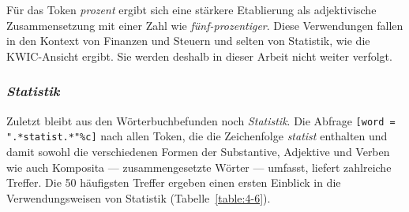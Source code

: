 \space

Für das Token \textit{prozent} ergibt sich eine stärkere Etablierung als adjektivische Zusammensetzung mit einer Zahl wie \textit{fünf-prozentiger}. Diese Verwendungen fallen in den Kontext von Finanzen und Steuern und selten von Statistik, wie die KWIC-Ansicht ergibt. Sie werden deshalb in dieser Arbeit nicht weiter verfolgt.

\subsubsection{\textit{Statistik}}

Zuletzt bleibt aus den Wörterbuchbefunden noch \textit{Statistik}. Die Abfrage \texttt{[word = ".*statist.*"\%c]} nach allen Token, die die Zeichenfolge \textit{statist} enthalten und damit sowohl die verschiedenen Formen der Substantive, Adjektive und Verben wie auch Komposita --- zusammengesetzte Wörter --- umfasst, liefert zahlreiche Treffer. Die 50 häufigsten Treffer ergeben einen ersten Einblick in die Verwendungsweisen von Statistik (Tabelle~\ref{table:4-6}).
\\

